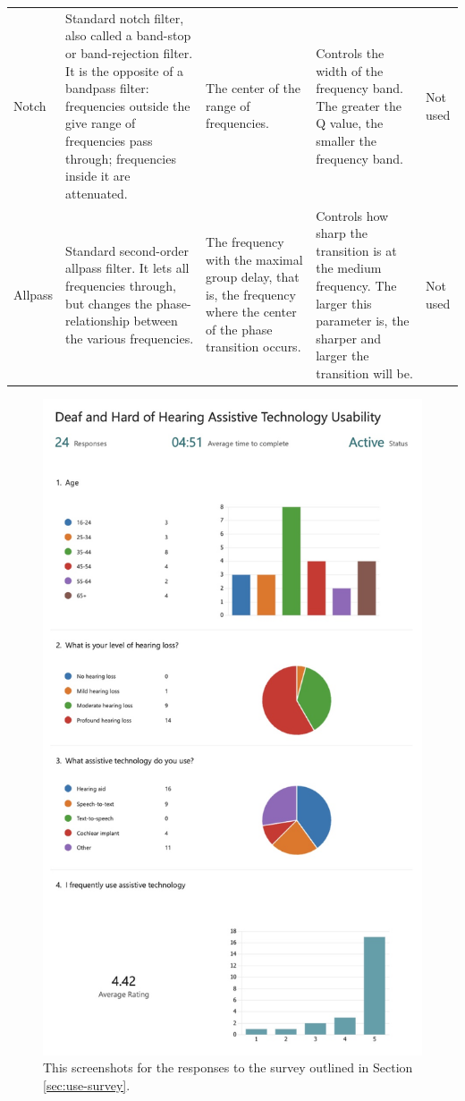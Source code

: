 \documentclass{l4proj}
\begin{document}
\begin{appendices}
\begin{landscape}
\begin{table}[htbp]
\begin{tabular}{p{3cm}p{6cm}p{4cm}p{4cm}p{4cm}}
    Notch & Standard notch filter, also called a band-stop or band-rejection filter. It is the opposite of a bandpass filter: frequencies outside the give range of frequencies pass through; frequencies inside it are attenuated. & The center of the range of frequencies. & Controls the width of the frequency band. The greater the Q value, the smaller the frequency band. & Not used \\ 
    Allpass & Standard second-order allpass filter. It lets all frequencies through, but changes the phase-relationship between the various frequencies. & The frequency with the maximal group delay, that is, the frequency where the center of the phase transition occurs. & Controls how sharp the transition is at the medium frequency. The larger this parameter is, the sharper and larger the transition will be. & Not used \\ 
    \end{tabular}
\end{table}
\end{landscape}

\begin{figure}[H]
    \centering
    \includegraphics[width=0.75\linewidth]{dissertation/images/use-survey-1.jpeg}    
    \caption{This screenshots for the responses to the survey outlined in Section \ref{sec:use-survey}.}
    \label{fig:use-survey-1} 
\end{figure}


\end{appendices}
\end{document}
